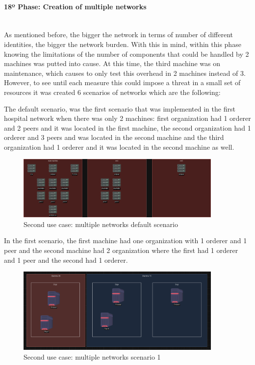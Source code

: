 \paragraph{18º Phase: Creation of multiple networks}\mbox{}\\
As mentioned before, the bigger the network in terms of number of different identities, the bigger the network burden. With this in mind, within this phase knowing the limitations of the number of components that could be handled by 2 machines was putted into cause. At this time, the third machine was on maintenance, which causes to only test this overhead in 2 machines instead of 3. However, to see until each measure this could impose a threat in a small set of resources it was created 6 scenarios of networks which are the following:

The default scenario, was the first scenario that was implemented in the first hospital network when there was only 2 machines: first organization had 1 orderer and 2 peers and it was located in the first machine, the second organization had 1 orderer and 3 peers and was located in the second machine and the third organization had 1 orderer and it was located in the second machine as well.

\begin{figure}[H]
    \centering
    \includegraphics[width=0.9\textwidth]{assets/use-case-2/default-first-netwrk.drawio.png} %
    \caption{Second use case: multiple networks default scenario}
    \label{fig:sample-image} 
\end{figure}

In the first scenario, the first machine had one organization with 1 orderer and 1 peer and the second machine had 2 organization where the first had 1 orderer and 1 peer and the second had 1 orderer.

\begin{figure}[H]
    \centering
    \includegraphics[width=0.9\textwidth]{assets/use-case-2/scenario1.png} %
    \caption{Second use case: multiple networks scenario 1}
    \label{fig:sample-image} 
\end{figure}

